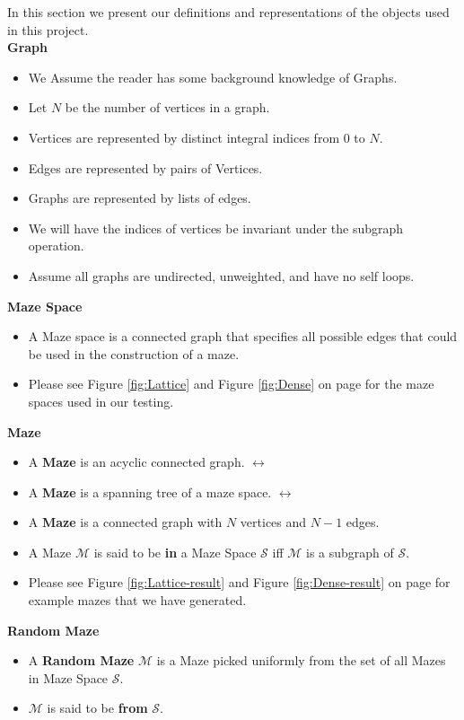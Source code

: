 \documentclass[11pt]{article}
\begin{document}
In this section we present our definitions and representations of the objects used in this project.\\

\textbf{Graph}
\begin{itemize}
\item We Assume the reader has some background knowledge of Graphs.
\item Let $N$ be the number of vertices in a graph.
\item Vertices are represented by distinct integral indices from 0 to $N$.
\item Edges are represented by pairs of Vertices.
\item Graphs are represented by lists of edges.
\item We will have the indices of vertices be invariant under the subgraph operation.
\item Assume all graphs are undirected, unweighted, and have no self loops.
\end{itemize}


\textbf{Maze Space}
\begin{itemize}
\item A Maze space is a connected graph that specifies all possible edges that could be used in the construction of a maze.
\item Please see Figure \ref{fig:Lattice} and Figure \ref{fig:Dense} on page \pageref{fig:Lattice} for the maze spaces used in our testing.
\end{itemize}

\textbf{Maze}
\begin{itemize}
\item A \textbf{Maze} is an acyclic connected graph. $\leftrightarrow$
\item A \textbf{Maze} is a spanning tree of a maze space. $\leftrightarrow$
\item A \textbf{Maze} is a connected graph with $N$ vertices and $N - 1$ edges.\\
\item A Maze $\mathcal{M}$ is said to be \textbf{in} a Maze Space $\mathcal{S}$ iff $\mathcal{M}$ is a subgraph of $\mathcal{S}$.
\item Please see Figure \ref{fig:Lattice-result} and Figure \ref{fig:Dense-result} on page  \pageref{fig:Lattice-result} for example mazes that we have generated.
\end{itemize}

\textbf{Random Maze}
\begin{itemize}
\item A \textbf{Random Maze} $\mathcal{M}$ is a Maze picked uniformly from the set of all Mazes
in Maze Space $\mathcal{S}$.
\item $\mathcal{M}$ is said to be \textbf{from} $\mathcal{S}$.
\end{itemize}
\end{document}
